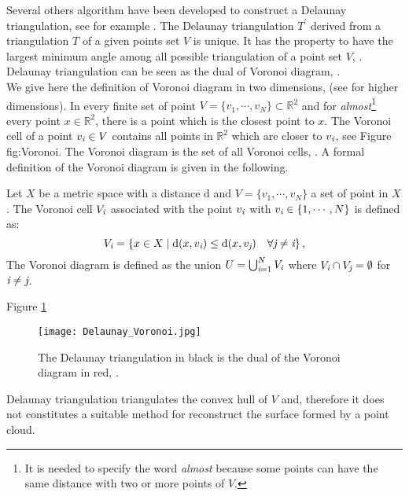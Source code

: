 Several others algorithm have been developed to construct a Delaunay triangulation, see for example \cite{lee1980two, renka1997algorithm}.
The Delaunay triangulation $T^\prime$ derived from a triangulation $T$ of a given points set $V$ is unique. It has the property to have the largest minimum angle among all possible triangulation of a point set $V$, \cite{press2007numerical}. 
Delaunay triangulation can be seen as the dual of Voronoi diagram, \cite{fortune1992voronoi}.\\\indent
We give here the definition of Voronoi diagram in two dimensions, (see \cite{brown1979voronoi} for higher dimensions).
In every finite set of point $V = \{v_1, \cdots, v_N\}\subset \mathbb{R}^2$ and for \textit{almost}\footnote{It is needed to specify the word \textit{almost} because some points can have the same distance with two or more points of $V$.} every point $x\in \mathbb{R}^2$, there is a point which is the closest point to $x$. The Voronoi cell of a point $v_{\textit{i}}\in V$ contains all points in $\mathbb{R}^2$ which are closer to $v_{\textit{i}}$, see Figure {fig:Voronoi}. 
The Voronoi diagram is the set of all Voronoi cells, \cite{cazals2005conformal}.
A formal definition of the Voronoi diagram is given in the following.
\begin{defn}
Let $X$ be a metric space with a distance $\textrm{d}$ and $V=\{v_1,\cdots,v_N\}$ a set of point in $X$. The Voronoi cell $V_{\textit{i}}$ associated with the point $v_{\textit{i}}$ with $v_{\textit{i}}\in\{1,\cdots,N\}$ is defined as:
\begin{equation}
V_{\textit{i}}=\{x\in X\; | \;\textrm{d}(x,v_{\textit{i}})\leq \textrm{d}(x,v_{\textit{j}}) \quad \forall \textit{j}\neq \textit{i} \}\,,
\end{equation}
The Voronoi diagram is defined as the union $U = \bigcup_{\textit{i}=1}^N V_{\textit{i}}$ where $V_{\textit{i}}\cap V_{\textit{j}}= \emptyset$ for $\textit{i}\neq\textit{j}$.
\end{defn}
Figure \ref{fig:Voronoi}
\begin{figure}[h]\label{fig:Voronoi}
\begin{center}
\texttt{[image: Delaunay\_Voronoi.jpg]}
\caption{The Delaunay triangulation in black is the dual of the Voronoi diagram in red, \cite{Wiki4}.}
\label{fig:Voronoi}
\end{center}
\end{figure}
Delaunay triangulation triangulates the convex hull of $V$ and, therefore it does not constitutes a suitable method for reconstruct the surface formed by a point cloud. 
